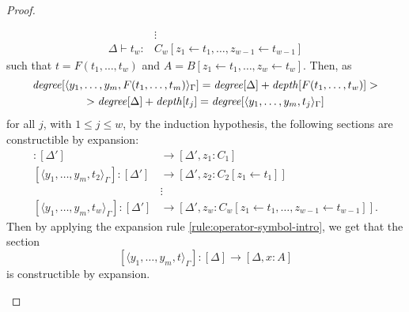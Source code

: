 \begin{proof}
\begin{enumerate}
\begin{align*}
                &\vdots \\
                \Delta \vdash t_w \colon& C_w[z_1  \leftarrow  t_1, \dots, z_{w-1}  \leftarrow  t_{w-1}] 
            \end{align*}
            such that $t = F(t_1, \dots, t_w)$ and $A = B[z_1  \leftarrow  t_1, \dots, z_w  \leftarrow  t_w]$.
            Then, as 
            \begin{multline*}
                \operatorname{\mathit{degree}}[\langle y_1, \dots, y_m, F(t_1, \dots, t_m) \rangle_\Gamma] = \operatorname{\mathit{degree}}[\Delta] + \operatorname{\mathit{depth}}[F(t_1, \dots, t_w)] > \\
                    > \operatorname{\mathit{degree}}[\Delta] + \operatorname{\mathit{depth}}[t_j] = \operatorname{\mathit{degree}}[\langle y_1, \dots, y_m, t_j \rangle_\Gamma]
            \end{multline*}
            for all $j$, with $1 \leq j \leq w$, by the induction hypothesis, the following sections are constructible by expansion: 
            \begin{align*}
                [\langle y_1, \dots, y_m, t_1 \rangle_\Gamma] \colon [\Delta'] &\to [\Delta', z_1 \colon C_1] \\
                [\langle y_1, \dots, y_m, t_2 \rangle_\Gamma] \colon [\Delta'] &\to [\Delta', z_2 \colon C_2[z_1  \leftarrow  t_1]] \\
                &\vdots \\
                [\langle y_1, \dots, y_m, t_w \rangle_\Gamma] \colon [\Delta'] &\to [\Delta', z_w \colon C_w[z_1  \leftarrow  t_1, \dots, z_{w-1}  \leftarrow  t_{w-1}]].
            \end{align*}
            Then by applying the expansion rule \ref{rule:operator-symbol-intro}, we get that the section \[
                [\langle y_1, \dots, y_m, t \rangle_\Gamma] \colon [\Delta] \to [\Delta, x \colon A]
            \] is constructible by expansion. \qedhere
    \end{enumerate}
\end{proof}

